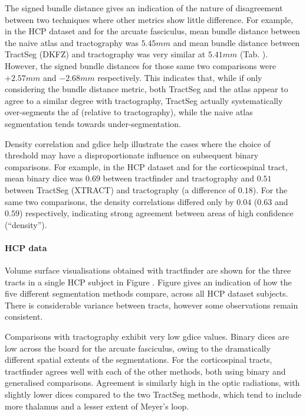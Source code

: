 The signed bundle distance gives an indication of the nature of disagreement between two techniques where other metrics show little difference.
For example, in the HCP dataset and for the arcuate fasciculus, mean bundle distance between the naive atlas and tractography was $5.45 mm$ and mean bundle distance between TractSeg (DKFZ) and tractography was very similar at $5.41 mm$ (Tab. ).
However, the signed bundle distances for those same two comparisons were $+2.57 mm$ and $-2.68 mm$ respectively.
This indicates that, while if only considering the bundle distance metric, both TractSeg and the atlas appear to agree to a similar degree with tractography, TractSeg actually systematically over-segments the \gls{af} (relative to tractography), while the naive atlas segmentation tends towards under-segmentation.

Density correlation and \gls{gdice} help illustrate the cases where the choice of threshold may have a disproportionate influence on subsequent binary comparisons.
For example, in the HCP dataset and for the corticospinal tract, mean binary \gls{dice} was $0.69$ between tractfinder and tractography and $0.51$ between TractSeg (XTRACT) and tractography (a difference of $0.18$).
For the same two comparisons, the density correlations differed only by $0.04$ ($0.63$ and $0.59$) respectively, indicating strong agreement between areas of high confidence (``density'').

\paragraph*{HCP data}

Volume surface visualisations obtained with tractfinder are shown for the three tracts in a single HCP subject in Figure .
Figure  gives an indication of how the five different segmentation methods compare, across all HCP dataset subjects.
There is considerable variance between tracts, however some observations remain consistent.

Comparisons with tractography exhibit very low \gls{gdice} values.
Binary \gls{dice}s are low across the board for the arcuate fasciculus, owing to the dramatically different spatial extents of the segmentations.
For the corticospinal tracts, tractfinder agrees well with each of the other methods, both using binary and generalised comparisons.
Agreement is similarly high in the optic radiations, with slightly lower \gls{dice}s compared to the two TractSeg methods, which tend to include more thalamus and a lesser extent of Meyer's loop.

